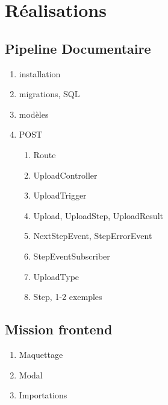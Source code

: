 \chapter{Réalisations}\label{ch:realisations}

\section{Pipeline Documentaire}

\begin{enumerate}
    \item installation
    \item migrations, SQL
    \item modèles
    \item POST
          \begin{enumerate}
              \item Route
              \item UploadController
              \item UploadTrigger
              \item Upload, UploadStep, UploadResult
              \item NextStepEvent, StepErrorEvent
              \item StepEventSubscriber
              \item UploadType
              \item Step, 1-2 exemples
          \end{enumerate}
\end{enumerate}

\section{Mission frontend}

\begin{enumerate}
    \item Maquettage
    \item Modal
    \item Importations
\end{enumerate}